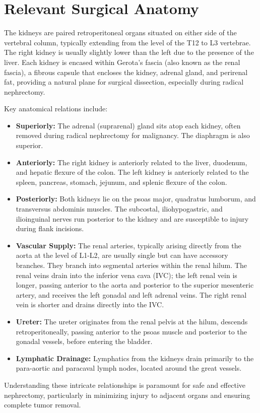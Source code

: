 \section*{Relevant Surgical Anatomy}
The kidneys are paired retroperitoneal organs situated on either side of the vertebral column, typically extending from the level of the T12 to L3 vertebrae. The right kidney is usually slightly lower than the left due to the presence of the liver. Each kidney is encased within Gerota's fascia (also known as the renal fascia), a fibrous capsule that encloses the kidney, adrenal gland, and perirenal fat, providing a natural plane for surgical dissection, especially during radical nephrectomy.

Key anatomical relations include:
\begin{itemize}
  \item \textbf{Superiorly:} The adrenal (suprarenal) gland sits atop each kidney, often removed during radical nephrectomy for malignancy. The diaphragm is also superior.
  \item \textbf{Anteriorly:} The right kidney is anteriorly related to the liver, duodenum, and hepatic flexure of the colon. The left kidney is anteriorly related to the spleen, pancreas, stomach, jejunum, and splenic flexure of the colon.
  \item \textbf{Posteriorly:} Both kidneys lie on the psoas major, quadratus lumborum, and transversus abdominis muscles. The subcostal, iliohypogastric, and ilioinguinal nerves run posterior to the kidney and are susceptible to injury during flank incisions.
  \item \textbf{Vascular Supply:} The renal arteries, typically arising directly from the aorta at the level of L1-L2, are usually single but can have accessory branches. They branch into segmental arteries within the renal hilum. The renal veins drain into the inferior vena cava (IVC); the left renal vein is longer, passing anterior to the aorta and posterior to the superior mesenteric artery, and receives the left gonadal and left adrenal veins. The right renal vein is shorter and drains directly into the IVC.
  \item \textbf{Ureter:} The ureter originates from the renal pelvis at the hilum, descends retroperitoneally, passing anterior to the psoas muscle and posterior to the gonadal vessels, before entering the bladder.
  \item \textbf{Lymphatic Drainage:} Lymphatics from the kidneys drain primarily to the para-aortic and paracaval lymph nodes, located around the great vessels.
\end{itemize}
Understanding these intricate relationships is paramount for safe and effective nephrectomy, particularly in minimizing injury to adjacent organs and ensuring complete tumor removal.

